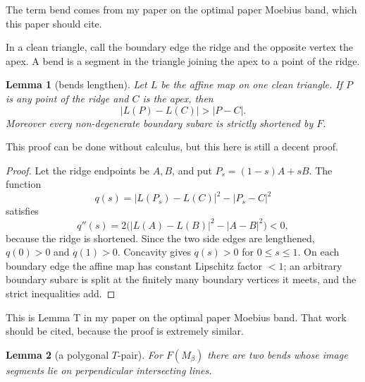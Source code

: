 \documentclass[12pt]{article}
\newtheorem{lemma}{Lemma}
\newcommand{\review}[1]{\begin{reviewbox}#1\end{reviewbox}}
\begin{document}
\review{The term bend comes from my paper on the optimal paper Moebius band, which this paper should cite.}

In a clean triangle, call the boundary edge the ridge and the opposite
vertex the apex.  A bend is a segment in the triangle joining the apex to
a point of the ridge.



\begin{lemma}[bends lengthen]\label{lem:lengthen}
Let \(L\) be the affine map on one clean triangle.  If \(P\) is any point
of the ridge and \(C\) is the apex, then
\[
        |L(P)-L(C)|>|P-C|.
\]
Moreover every non-degenerate boundary subarc is strictly shortened by
\(F\).
\end{lemma}

\review{This proof can be done without calculus, but this here is still a decent proof.}



\begin{proof}
Let the ridge endpoints be \(A,B\), and put \(P_s=(1-s)A+sB\).  The
function
\[
 q(s)= |L(P_s)-L(C)|^2-|P_s-C|^2
\]
satisfies
\[
 q''(s)=2\big(|L(A)-L(B)|^2-|A-B|^2\big)<0,
\]
because the ridge is shortened.  Since the two side edges are lengthened,
\(q(0)>0\) and \(q(1)>0\).  Concavity gives \(q(s)>0\) for
\(0\le s\le1\).  On each boundary edge the affine map has constant
Lipschitz factor \(<1\); an arbitrary boundary subarc is split at the
finitely many boundary vertices it meets, and the strict inequalities add.
\end{proof}


\review{This is Lemma T in my paper on the optimal paper Moebius band.  That work should be cited, because the proof is extremely similar.}


\begin{lemma}[a polygonal \(T\)-pair]\label{lem:T}
For \(F(M_\beta)\) there are two bends whose image segments lie on
perpendicular intersecting lines.
\end{lemma}
\end{document}
